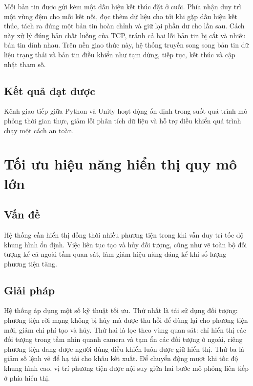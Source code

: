 ﻿\documentclass[../DoAn.tex]{subfiles}
\begin{document}
Mỗi bản tin được gửi kèm một dấu hiệu kết thúc đặt ở cuối. Phía nhận duy trì một
vùng đệm cho mỗi kết nối, đọc thêm dữ liệu cho tới khi gặp dấu hiệu kết thúc, tách
ra đúng một bản tin hoàn chỉnh và giữ lại phần dư cho lần sau. Cách này xử lý đúng
bản chất luồng của TCP, tránh cả hai lỗi bản tin bị cắt và nhiều bản tin dính
nhau. Trên nền giao thức này, hệ thống truyền song song bản tin dữ liệu trạng thái
và bản tin điều khiển như tạm dừng, tiếp tục, kết thúc và cập nhật tham số.

\subsection{Kết quả đạt được}

Kênh giao tiếp giữa Python và Unity hoạt động ổn định trong suốt quá trình mô
phỏng thời gian thực, giảm lỗi phân tích dữ liệu và hỗ trợ điều khiển quá trình
chạy một cách an toàn.

\section{Tối ưu hiệu năng hiển thị quy mô lớn}
\label{sec:toi-uu}

\subsection{Vấn đề}

Hệ thống cần hiển thị đồng thời nhiều phương tiện trong khi vẫn duy trì tốc độ
khung hình ổn định. Việc liên tục tạo và hủy đối tượng, cũng như vẽ toàn bộ đối
tượng kể cả ngoài tầm quan sát, làm giảm hiệu năng đáng kể khi số lượng phương
tiện tăng.

\subsection{Giải pháp}

Hệ thống áp dụng một số kỹ thuật tối ưu. Thứ nhất là tái sử dụng đối tượng: phương
tiện rời mạng không bị hủy mà được thu hồi để dùng lại cho phương tiện mới, giảm
chi phí tạo và hủy. Thứ hai là lọc theo vùng quan sát: chỉ hiển thị các đối tượng
trong tầm nhìn quanh camera và tạm ẩn các đối tượng ở ngoài, riêng phương tiện
đang được người dùng điều khiển luôn được giữ hiển thị. Thứ ba là giảm số lệnh vẽ
để hạ tải cho khâu kết xuất. Để chuyển động mượt khi tốc độ khung hình cao, vị trí
phương tiện được nội suy giữa hai bước mô phỏng liên tiếp ở phía hiển thị.
\end{document}
